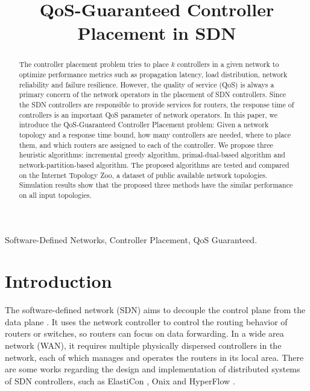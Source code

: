 \documentclass[conference]{IEEEtran}
\begin{document}
 

\title{QoS-Guaranteed Controller Placement in SDN}
\author{
}
\maketitle

\begin{abstract}
The controller placement problem tries to place $k$ controllers in a given network to optimize performance metrics such as propagation latency, load distribution, network reliability and failure resilience. However, the quality of service (QoS) is always a primary concern of the network operators in the placement of SDN controllers. Since the SDN controllers are responsible to provide services for routers, the response time of controllers is an important QoS parameter of network operators. In this paper, we introduce the QoS-Guaranteed Controller Placement problem: Given a network topology and a response time bound, how many controllers are needed, where to place them, and which routers are assigned to each of the controller. We propose three heuristic algorithms: incremental greedy algorithm, primal-dual-based algorithm and network-partition-based algorithm. The proposed algorithms are tested and compared on the Internet Topology Zoo, a dataset of public available network topologies. Simulation results show that the proposed three methods have the similar performance on all input topologies. 
\end{abstract}

\begin{IEEEkeywords}
Software-Defined Networks, Controller Placement, QoS Guaranteed.
\end{IEEEkeywords}

\section{Introduction}

The software-defined network (SDN) aims to decouple the control plane from the data plane \cite{nunes2014survey}. It uses the network controller to control the routing behavior of routers or switches, so routers can focus on data forwarding. In a wide area network (WAN), it requires multiple physically dispersed controllers in the network, each of which manages and operates the routers in its local area. There are some works regarding the design and implementation of distributed systems of SDN controllers, such as ElastiCon \cite{dixit2013towards}, Onix \cite{koponen2010onix} and HyperFlow \cite{tootoonchian2010hyperflow}. 
\end{document}
